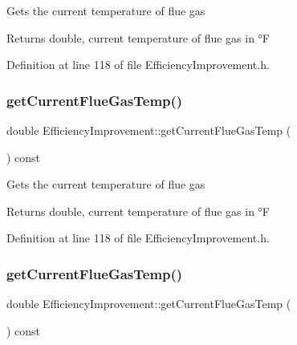 Gets the current temperature of flue gas

\begin{DoxyReturn}{Returns}
double, current temperature of flue gas in °F 
\end{DoxyReturn}


Definition at line 118 of file Efficiency\+Improvement.\+h.

\mbox{\label{class_efficiency_improvement_a27e97b5c7aad8aa6b4d02e18354d2292}} 
\subsubsection{\texorpdfstring{get\+Current\+Flue\+Gas\+Temp()}{getCurrentFlueGasTemp()}\hspace{0.1cm}{\footnotesize\ttfamily [2/3]}}
{\footnotesize\ttfamily double Efficiency\+Improvement\+::get\+Current\+Flue\+Gas\+Temp (\begin{DoxyParamCaption}{ }\end{DoxyParamCaption}) const\hspace{0.3cm}{\ttfamily [inline]}}

Gets the current temperature of flue gas

\begin{DoxyReturn}{Returns}
double, current temperature of flue gas in °F 
\end{DoxyReturn}


Definition at line 118 of file Efficiency\+Improvement.\+h.

\mbox{\label{class_efficiency_improvement_a27e97b5c7aad8aa6b4d02e18354d2292}} 
\subsubsection{\texorpdfstring{get\+Current\+Flue\+Gas\+Temp()}{getCurrentFlueGasTemp()}\hspace{0.1cm}{\footnotesize\ttfamily [3/3]}}
{\footnotesize\ttfamily double Efficiency\+Improvement\+::get\+Current\+Flue\+Gas\+Temp (\begin{DoxyParamCaption}{ }\end{DoxyParamCaption}) const\hspace{0.3cm}{\ttfamily [inline]}}

